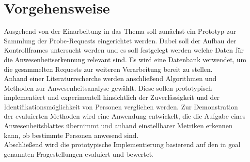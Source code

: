 \section{Vorgehensweise}\label{approach}
Ausgehend von der Einarbeitung in das Thema soll zunächst ein Prototyp zur Sammlung der Probe-Requests eingerichtet werden.
Dabei soll der Aufbau der Kontrollframes untersucht werden und es soll festgelegt werden welche Daten für die Anwesenheitserkennung relevant sind.
Es wird eine Datenbank verwendet, um die gesammelten Requests zur weiteren Verarbeitung bereit zu stellen.
\\

Anhand einer Literaturrecherche werden anschließend Algorithmen und Methoden zur Anwesenheitsanalyse gewählt.
Diese sollen prototypisch implementiert und experimentell hinsichtlich der Zuverlässigkeit und der Identifikationsmöglichkeit von Personen verglichen werden.
Zur Demonstration der evaluierten Methoden wird eine Anwendung entwickelt, die die Aufgabe eines Anwesenheitsblattes übernimmt und anhand einstellbarer Metriken erkennen kann, ob bestimmte Personen anwesend sind.
\\

Abschließend wird die prototypische Implementierung basierend auf den in \refname{goal} genannten Fragestellungen evaluiert und bewertet.